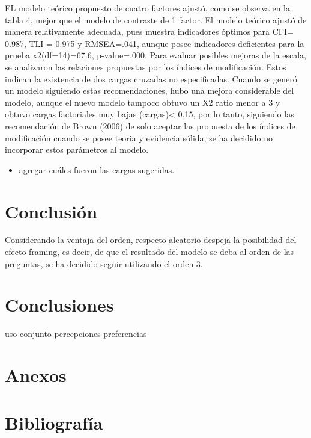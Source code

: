 \documentclass[
]{article}
\providecommand{\tightlist}{%
  \setlength{\itemsep}{0pt}\setlength{\parskip}{0pt}}
\begin{document}
EL modelo teórico propuesto de cuatro factores ajustó, como se observa
en la tabla 4, mejor que el modelo de contraste de 1 factor. El modelo
teórico ajustó de manera relativamente adecuada, pues muestra
indicadores óptimos para CFI= 0.987, TLI = 0.975 y RMSEA=.041, aunque
posee indicadores deficientes para la prueba x2(df=14)=67.6,
p-value=.000. Para evaluar posibles mejoras de la escala, se analizaron
las relaciones propuestas por los índices de modificación. Estos indican
la existencia de dos cargas cruzadas no especificadas. Cuando se generó
un modelo siguiendo estas recomendaciones, hubo una mejora considerable
del modelo, aunque el nuevo modelo tampoco obtuvo un X2 ratio menor a 3
y obtuvo cargas factoriales muy bajas (cargas)\textless{} 0.15, por lo
tanto, siguiendo las recomendación de Brown (2006) de solo aceptar las
propuesta de los índices de modificación cuando se posee teoria y
evidencia sólida, se ha decidido no incorporar estos parámetros al
modelo.

\begin{itemize}
\tightlist
\item
  agregar cuáles fueron las cargas sugeridas.
\end{itemize}

\hypertarget{conclusiuxf3n}{%
\section{Conclusión}\label{conclusiuxf3n}}

Considerando la ventaja del orden, respecto aleatorio despeja la
posibilidad del efecto framing, es decir, de que el resultado del modelo
se deba al orden de las preguntas, se ha decidido seguir utilizando el
orden 3.

\hypertarget{conclusiones}{%
\section{Conclusiones}\label{conclusiones}}

uso conjunto percepciones-preferencias

\hypertarget{anexos}{%
\section{Anexos}\label{anexos}}

\hypertarget{bibliografuxeda}{%
\section*{Bibliografía}\label{bibliografuxeda}}
\end{document}
